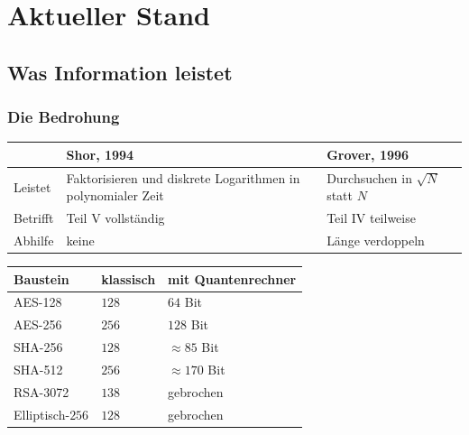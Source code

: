 \part{Aktueller Stand}

\chapter{Was Information leistet}

\section{Die Bedrohung}

\begin{merksatz}
\begin{center}
{\small
\renewcommand{\arraystretch}{1.55}
\begin{tabular}{@{}P{2.0cm}P{3.0cm}P{3.4cm}@{}}
\toprule
& \textbf{Shor, 1994} & \textbf{Grover, 1996}\\
\midrule
Leistet & Faktorisieren und diskrete Logarithmen in polynomialer Zeit & Durchsuchen in $\sqrt N$ statt $N$\\
Betrifft & \textcolor{akzent}{Teil V vollständig} & Teil IV teilweise\\
Abhilfe & \textcolor{akzent}{keine} & \textcolor{gruen}{Länge verdoppeln}\\
\bottomrule
\end{tabular}}
\end{center}

\begin{center}
{\small
\renewcommand{\arraystretch}{1.48}
\begin{tabular}{@{}P{2.6cm}P{2.0cm}P{2.6cm}@{}}
\toprule
\textbf{Baustein} & \textbf{klassisch} & \textbf{mit Quantenrechner}\\
\midrule
AES-128 & $128$ & $64$ Bit\\
AES-256 & $256$ & \textcolor{gruen}{$128$ Bit}\\
SHA-256 & $128$ & $\approx 85$ Bit\\
SHA-512 & $256$ & \textcolor{gruen}{$\approx 170$ Bit}\\
RSA-3072 & $138$ & \textcolor{akzent}{gebrochen}\\
Elliptisch-$256$ & $128$ & \textcolor{akzent}{gebrochen}\\
\bottomrule
\end{tabular}}
\end{center}


\end{merksatz}

